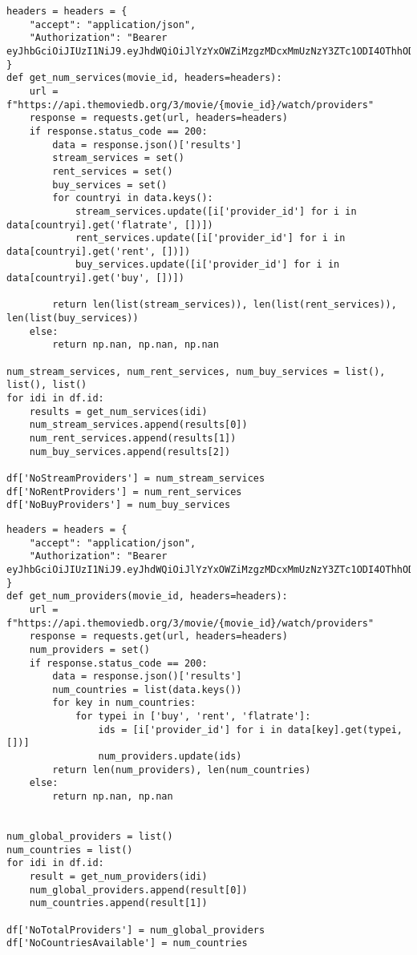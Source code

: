 \begin{lstlisting}
headers = headers = {
    "accept": "application/json",
    "Authorization": "Bearer eyJhbGciOiJIUzI1NiJ9.eyJhdWQiOiJlYzYxOWZiMzgzMDcxMmUzNzY3ZTc1ODI4OThhODU5MiIsInN1YiI6IjYwOTQ0MmRhMDIzMWYyMDA3OWVkYzRmOSIsInNjb3BlcyI6WyJhcGlfcmVhZCJdLCJ2ZXJzaW9uIjoxfQ.zhJcEIpbNKItZyiRAWcJ9QvCXA59reAmEg2GZ9jQmqE"
}
def get_num_services(movie_id, headers=headers):
    url = f"https://api.themoviedb.org/3/movie/{movie_id}/watch/providers"
    response = requests.get(url, headers=headers)
    if response.status_code == 200:
        data = response.json()['results']
        stream_services = set()
        rent_services = set()
        buy_services = set()
        for countryi in data.keys():
            stream_services.update([i['provider_id'] for i in data[countryi].get('flatrate', [])])
            rent_services.update([i['provider_id'] for i in data[countryi].get('rent', [])])
            buy_services.update([i['provider_id'] for i in data[countryi].get('buy', [])])
            
        return len(list(stream_services)), len(list(rent_services)), len(list(buy_services))
    else:
        return np.nan, np.nan, np.nan

num_stream_services, num_rent_services, num_buy_services = list(), list(), list()
for idi in df.id:
    results = get_num_services(idi)
    num_stream_services.append(results[0])
    num_rent_services.append(results[1])
    num_buy_services.append(results[2])

df['NoStreamProviders'] = num_stream_services
df['NoRentProviders'] = num_rent_services
df['NoBuyProviders'] = num_buy_services
\end{lstlisting}

\begin{lstlisting}
headers = headers = {
    "accept": "application/json",
    "Authorization": "Bearer eyJhbGciOiJIUzI1NiJ9.eyJhdWQiOiJlYzYxOWZiMzgzMDcxMmUzNzY3ZTc1ODI4OThhODU5MiIsInN1YiI6IjYwOTQ0MmRhMDIzMWYyMDA3OWVkYzRmOSIsInNjb3BlcyI6WyJhcGlfcmVhZCJdLCJ2ZXJzaW9uIjoxfQ.zhJcEIpbNKItZyiRAWcJ9QvCXA59reAmEg2GZ9jQmqE"
}
def get_num_providers(movie_id, headers=headers):
    url = f"https://api.themoviedb.org/3/movie/{movie_id}/watch/providers"
    response = requests.get(url, headers=headers)
    num_providers = set()
    if response.status_code == 200:
        data = response.json()['results']
        num_countries = list(data.keys())
        for key in num_countries:
            for typei in ['buy', 'rent', 'flatrate']:
                ids = [i['provider_id'] for i in data[key].get(typei, [])]
                num_providers.update(ids)
        return len(num_providers), len(num_countries)
    else:
        return np.nan, np.nan


num_global_providers = list()
num_countries = list()
for idi in df.id:
    result = get_num_providers(idi)
    num_global_providers.append(result[0])
    num_countries.append(result[1])

df['NoTotalProviders'] = num_global_providers
df['NoCountriesAvailable'] = num_countries
\end{lstlisting}

